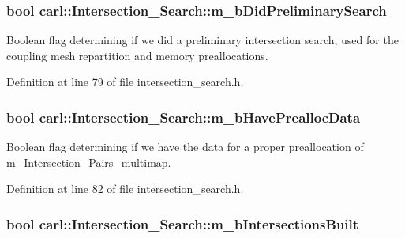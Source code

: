 \subsubsection[{m\+\_\+b\+Did\+Preliminary\+Search}]{\setlength{\rightskip}{0pt plus 5cm}bool carl\+::\+Intersection\+\_\+\+Search\+::m\+\_\+b\+Did\+Preliminary\+Search\hspace{0.3cm}{\ttfamily [protected]}}\label{classcarl_1_1_intersection___search_ab3d9729d5029e30fff786305c8aa3a01}


Boolean flag determining if we did a preliminary intersection search, used for the coupling mesh repartition and memory preallocations. 



Definition at line 79 of file intersection\+\_\+search.\+h.

\hypertarget{classcarl_1_1_intersection___search_ac3eae683cb64b5bd8b7c0430d6e7496f}{}
\subsubsection[{m\+\_\+b\+Have\+Prealloc\+Data}]{\setlength{\rightskip}{0pt plus 5cm}bool carl\+::\+Intersection\+\_\+\+Search\+::m\+\_\+b\+Have\+Prealloc\+Data\hspace{0.3cm}{\ttfamily [protected]}}\label{classcarl_1_1_intersection___search_ac3eae683cb64b5bd8b7c0430d6e7496f}


Boolean flag determining if we have the data for a proper preallocation of m\+\_\+\+Intersection\+\_\+\+Pairs\+\_\+multimap. 



Definition at line 82 of file intersection\+\_\+search.\+h.

\hypertarget{classcarl_1_1_intersection___search_aff13141f4d631c406fb12b78950f0e1e}{}
\subsubsection[{m\+\_\+b\+Intersections\+Built}]{\setlength{\rightskip}{0pt plus 5cm}bool carl\+::\+Intersection\+\_\+\+Search\+::m\+\_\+b\+Intersections\+Built\hspace{0.3cm}{\ttfamily [protected]}}\label{classcarl_1_1_intersection___search_aff13141f4d631c406fb12b78950f0e1e}


